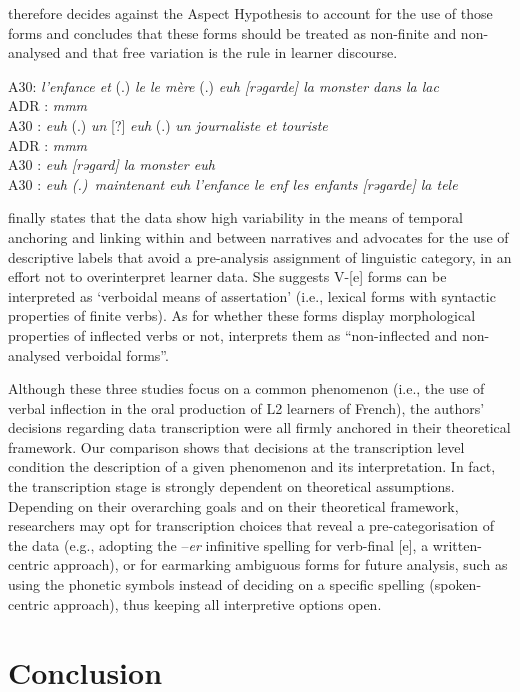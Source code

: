 \documentclass[output=paper,colorlinks,citecolor=brown,modfonts,nonflat]{../langscibook}
\begin{document}
\citet[132]{Granget2015} therefore decides against the Aspect Hypothesis to account for the use of those forms and concludes that these forms should be treated as non-finite and non-analysed and that free variation is the rule in learner discourse.

\ea%
    \label{ex:leclerq:14}
A30: \textit{l’enfance et} (.) \textit{le le mère} (.) \textit{euh [rəgarde] la monster dans la lac}\\
ADR : \textit{mmm}\\
A30 : \textit{euh} (.) \textit{un} [?] \textit{euh} (.) \textit{un journaliste et touriste}\\
ADR : \textit{mmm}\\
A30 : \textit{euh [rəgard] la monster euh}\\
A30 : \textit{euh (.)~maintenant euh l’enfance le enf les enfants [rəgarde] la tele}
    \z

\citet{Granget2015} finally states that the data show high variability in the means of temporal anchoring and linking within and between narratives and advocates for the use of descriptive labels that avoid a pre-analysis assignment of linguistic category, in an effort not to overinterpret learner data. She suggests V-[e] forms can be interpreted as ‘verboidal means of assertation’ (i.e., lexical forms with syntactic properties of finite verbs). As for whether these forms display morphological properties of inflected verbs or not, \cite[132]{Granget2015} interprets them as “non-inflected and non-analysed verboidal forms”.

Although these three studies focus on a common phenomenon (i.e., the use of verbal inflection in the oral production of L2 learners of French), the authors’ decisions regarding data transcription were all firmly anchored in their theoretical framework. Our comparison shows that decisions at the transcription level condition the description of a given phenomenon and its interpretation. In fact, the transcription stage is strongly dependent on theoretical assumptions. Depending on their overarching goals and on their theoretical framework, researchers may opt for transcription choices that reveal a pre-categorisation of the data (e.g., adopting the –\textit{er} infinitive spelling for verb-final [e], a written-centric approach), or for earmarking ambiguous forms for future analysis, such as using the phonetic symbols instead of deciding on a specific spelling (spoken-centric approach), thus keeping all interpretive options open.

\section{Conclusion}%
\end{document}
